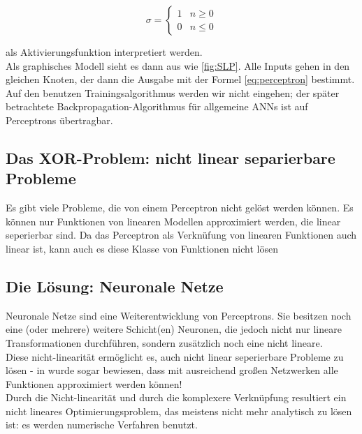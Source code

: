 \begin{equation}
    \sigma = \begin{cases}
               1               & n \geq 0\\
               0               & n \leq 0
           \end{cases}
\end{equation}

als Aktivierungsfunktion interpretiert werden.\\

Als graphisches Modell sieht es dann aus wie \ref{fig:SLP}. Alle Inputs gehen in den gleichen Knoten, der dann die Ausgabe mit der Formel \ref{eq:perceptron} bestimmt. 
Auf den benutzen Trainingsalgorithmus werden wir nicht eingehen; der später betrachtete Backpropagation-Algorithmus für allgemeine ANNs ist auf Perceptrons übertragbar.

\subsection{Das XOR-Problem: nicht linear separierbare Probleme}
Es gibt viele Probleme, die von einem Perceptron nicht gelöst werden können. Es können nur Funktionen von linearen Modellen approximiert werden, die linear seperierbar sind. Da das Perceptron als Verknüfung von linearen Funktionen auch linear ist, kann auch es diese Klasse von Funktionen nicht lösen

\subsection{Die Lösung: Neuronale Netze}
Neuronale Netze sind eine Weiterentwicklung von Perceptrons. Sie besitzen noch eine (oder mehrere) weitere Schicht(en) Neuronen, die jedoch nicht nur lineare Transformationen durchführen, sondern zusätzlich noch eine nicht lineare. \\

Diese nicht-linearität ermöglicht es, auch nicht linear seperierbare Probleme zu lösen - in \cite{cybenko1989approximation} wurde sogar bewiesen, dass mit ausreichend großen Netzwerken alle Funktionen approximiert werden können!\\

Durch die Nicht-linearität und durch die komplexere Verknüpfung resultiert ein nicht lineares Optimierungsproblem, das meistens nicht mehr analytisch zu lösen ist: es werden numerische Verfahren benutzt.


